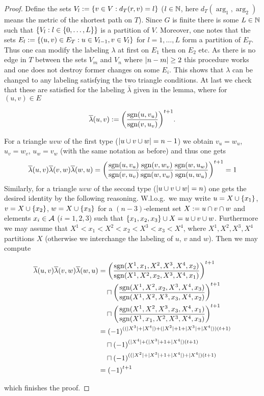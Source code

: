 \begin{proof}
    Define the sets $V_l:=\left\{v\in V: d_T(r,v)=l\right\}$ ($l\in\mathbb{N}$, here $d_T(\arg_1,\arg_2)$ means the metric of the shortest path on $T$). Since $G$ is finite there is some $L\in\mathbb{N}$ such that $\left\{V_l:l\in\left\{0,\ldots,L\right\}\right\}$ is a partition of $V$. Moreover, one notes that the sets $E_l:=\left\{(u,v)\in E_T:u\in V_{l-1},v\in V_l\right\}$ for $l=1,\ldots,L$ form a partition of $E_T$. Thus one can modify the labeling $\lambda$ at first on $E_1$ then on $E_2$ etc. As there is no edge in $T$ between the sets $V_m$ and $V_n$ where $\left|n-m\right|\geq 2$ this procedure works and one does not destroy former changes on some $E_i$. 
    This shows that $\lambda$ can be changed to any labeling satisfying the two triangle conditions.
    At last we check that these are satisfied for the labeling $\bar{\lambda}$ given in the lemma, where for $(u,v)\in E$

    $$
    \overline{\lambda}(u,v):={\left(\frac{\mathop\mathrm{sgn}(u,v_u)}{\mathop\mathrm{sgn}(v,u_v)}\right)}^{t+1}\text{.}
    $$
    
    For a triangle $uvw$ of the first type ($\left|u\cup v\cup w\right|=n-1$) we obtain $v_u=w_u$, $u_v=w_v$, $u_w=v_w$ (with the same notation as before) and thus one gets
    $$
    \overline{\lambda}(u,v)\overline{\lambda}(v,w)\overline{\lambda}(w,u) ={\left(\frac{\mathop\mathrm{sgn}(u,v_u)}{\mathop\mathrm{sgn}(v,u_v)}\frac{\mathop\mathrm{sgn}(v,w_v)}{\mathop\mathrm{sgn}(w,v_w)}\frac{\mathop\mathrm{sgn}(w,u_w)}{\mathop\mathrm{sgn}(u,w_u)}\right)}^{t+1}\\
    =1
    $$
    Similarly, for a triangle $uvw$ of the second type ($\left|u\cup v\cup w\right|=n$) one gets the desired identity by the following reasoning. W.l.o.g.\ we may write $u=X\cup\left\{x_1\right\}$, $v=X\cup\left\{x_2\right\}$, $w=X\cup\left\{x_3\right\}$ for a $(n-3)$-element set $X:=u\cap v\cap w$ and elements $x_i\in \mathcal{A}$ ($i=1,2,3$) such that $\left\{x_1,x_2,x_3\right\}\cup X=u\cup v\cup w$. Furthermore we may assume that $X^1<x_1<X^2<x_2<X^3<x_3<X^4$, where $X^1,X^2,X^3,X^4$ partitions $X$ (otherwise we interchange the labeling of $u$, $v$ and $w$). Then we may compute

    \begin{align*}
        \bar{\lambda}(u,v)\bar{\lambda}(v,w)\bar{\lambda}(w,u) 
 & = \left(\frac{\sgn(X^1,x_1,X^2,X^3,X^4,x_2)}{\sgn(X^1,X^2,x_2,X^3,X^4,x_1)}\right)^{t+1}              \\
 & \quad\settimes \left(\frac{\sgn(X^1,X^2,x_2,X^3,X^4,x_3)}{\sgn(X^1,X^2,X^3,x_3,X^4,x_2)}\right)^{t+1} \\
 & \quad\settimes \left(\frac{\sgn(X^1,X^2,X^3,x_3,X^4,x_1)}{\sgn(X^1,x_1,X^2,X^3,X^4,x_3)}\right)^{t+1} \\
 & = {(-1)}^{((|X^3|+|X^4|)+(|X^2|+1+|X^3|+|X^4|))(t+1)}                                                 \\
 & \quad\settimes {(-1)}^{(|X^4|+(|X^3|+1+|X^4|)(t+1)}                                                   \\
 & \quad\settimes {(-1)}^{((|X^2|+|X^3|+1+|X^4|)+|X^4|)(t+1)}                                            \\
 & = {(-1)}^{t+1}
\end{align*}

  which finishes the proof.
\end{proof}

